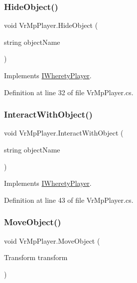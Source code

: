 \subsubsection{\texorpdfstring{HideObject()}{HideObject()}}
{\footnotesize\ttfamily void Vr\+Mp\+Player.\+Hide\+Object (\begin{DoxyParamCaption}\item[{string}]{object\+Name }\end{DoxyParamCaption})}



Implements \mbox{\hyperlink{interface_i_wherety_player_a2cd247a5438cb6b3142046991f39352c}{I\+Wherety\+Player}}.



Definition at line 32 of file Vr\+Mp\+Player.\+cs.

\mbox{\label{class_vr_mp_player_ac9b33feaa74e06413371cd9dbced5530}} 
\subsubsection{\texorpdfstring{InteractWithObject()}{InteractWithObject()}}
{\footnotesize\ttfamily void Vr\+Mp\+Player.\+Interact\+With\+Object (\begin{DoxyParamCaption}\item[{string}]{object\+Name }\end{DoxyParamCaption})}



Implements \mbox{\hyperlink{interface_i_wherety_player_af8af069999158f329d99f2709b0b4fb3}{I\+Wherety\+Player}}.



Definition at line 43 of file Vr\+Mp\+Player.\+cs.

\mbox{\label{class_vr_mp_player_a4f5c36d5a2629d9300f4aec04803e8f3}} 
\subsubsection{\texorpdfstring{MoveObject()}{MoveObject()}}
{\footnotesize\ttfamily void Vr\+Mp\+Player.\+Move\+Object (\begin{DoxyParamCaption}\item[{Transform}]{transform }\end{DoxyParamCaption})}



